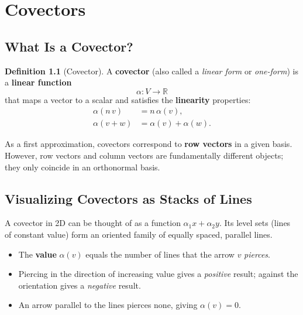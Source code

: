 \documentclass[12pt, a4paper]{report}
\theoremstyle{definition}
\newtheorem{definition}{Definition}[chapter]
\theoremstyle{plain}
\theoremstyle{remark}
\newcommand{\R}{\mathbb{R}}
\begin{document}
\chapter{Covectors}\label{ch:covectors}

\section{What Is a Covector?}

\begin{definition}[Covector]
A \textbf{covector} (also called a \emph{linear form} or \emph{one-form}) is a
\textbf{linear function}
\[
    \alpha : V \longrightarrow \R
\]
that maps a vector to a scalar and satisfies the \textbf{linearity} properties:
\begin{align}
    \alpha(n\,v) &= n\,\alpha(v), \label{eq:cov-scale}\\
    \alpha(v + w) &= \alpha(v) + \alpha(w). \label{eq:cov-add}
\end{align}
\end{definition}

As a first approximation, covectors correspond to \textbf{row vectors} in a given
basis.  However, row vectors and column vectors are fundamentally different objects;
they only coincide in an orthonormal basis.

\section{Visualizing Covectors as Stacks of Lines}

A covector in 2D can be thought of as a function $\alpha_1 x + \alpha_2 y$.  Its
level sets (lines of constant value) form an oriented family of equally spaced,
parallel lines.

\begin{itemize}[nosep]
    \item The \textbf{value} $\alpha(v)$ equals the number of lines that the arrow
          $v$ \emph{pierces}.
    \item Piercing in the direction of increasing value gives a \emph{positive}
          result; against the orientation gives a \emph{negative} result.
    \item An arrow parallel to the lines pierces none, giving $\alpha(v) = 0$.
\end{itemize}
\end{document}
